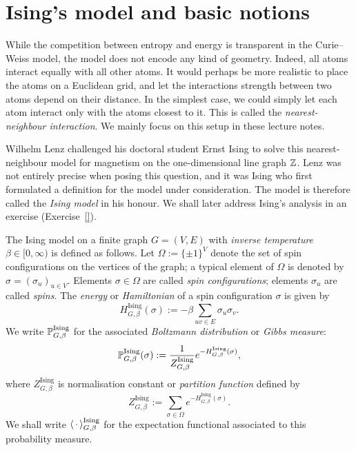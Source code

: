 \section{Ising's model and basic notions}
\label{sec:ising_1d}

While the competition between entropy and energy is transparent in the Curie--Weiss model,
the model does not encode any kind of geometry.
Indeed, all atoms interact equally with all other atoms.
It would perhaps be more realistic to place the atoms on a Euclidean grid,
and let the interactions strength between two atoms depend on their distance.
In the simplest case, we could simply let each atom interact only with the atoms
closest to it. This is called the \emph{nearest-neighbour interaction}.
We mainly focus on this setup in these lecture notes.

Wilhelm Lenz challenged his doctoral student Ernst Ising
to solve this nearest-neighbour model for magnetism on the one-dimensional line graph $\Z$.
Lenz was not entirely precise when posing this question,
and it was Ising who first formulated a definition for the model under consideration.
The model is therefore called the \emph{Ising model} in his honour.
We shall later address Ising's analysis in an exercise (Exercise~\ref{}).

\begin{definition}
    \label{def:ising_finite}
    The Ising model on a finite graph \( G = (V, E) \) with \emph{inverse temperature} \( \beta \in [0,\infty) \) is defined as follows.
    Let $\Omega:=\{\pm1\}^V$ denote the set of spin configurations on the vertices of the graph;
    a typical element of $\Omega$ is denoted by $\sigma=(\sigma_u)_{u\in V}$.
    Elements $\sigma\in\Omega$ are called \emph{spin configurations};
    elements $\sigma_u$ are called \emph{spins}.
    The \emph{energy} or \emph{Hamiltonian} of a spin configuration $\sigma$ is given by
    \[
        H_{G,\beta}^{\operatorname{Ising}}(\sigma) := -\beta \sum_{uv \in E} \sigma_u \sigma_v.
    \]
    We write $\P_{G,\beta}^{\operatorname{Ising}}$ for the associated \emph{Boltzmann distribution} or \emph{Gibbs measure}:
    \[
        \P_{G,\beta}^{\operatorname{Ising}}(\sigma) := \frac{1}{Z_{G,\beta}^{\operatorname{Ising}}} e^{-H^{\operatorname{Ising}}_{G,\beta}(\sigma)},
    \]
    where \(Z_{G,\beta}^{\operatorname{Ising}}\) is normalisation constant or \emph{partition function} defined by
    \[
        Z_{G,\beta}^{\operatorname{Ising}}:= \sum_{\sigma\in\Omega} e^{-H^{\operatorname{Ising}}_{G,\beta}(\sigma)}.
    \]
    We shall write $\langle\blank\rangle_{G,\beta}^{\operatorname{Ising}}$ for the expectation functional associated to this probability measure.
\end{definition}

